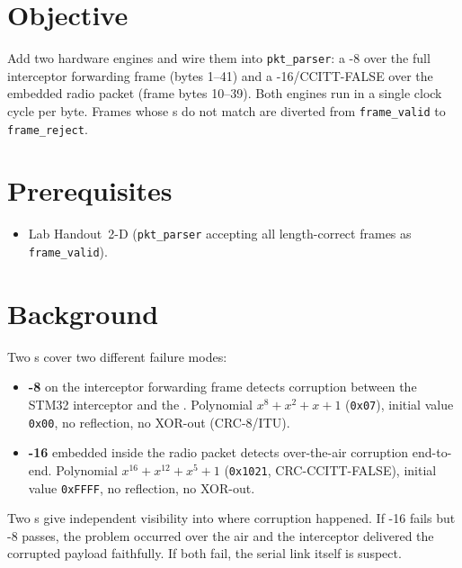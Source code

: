 \documentclass[11pt,letterpaper]{article}
\begin{document}

\section{Objective}
Add two hardware \CRC{} engines and wire them into \texttt{pkt\_parser}: a \CRC{}-8 over the full interceptor forwarding frame (bytes 1--41) and a \CRC{}-16/CCITT-FALSE over the embedded radio packet (frame bytes 10--39). Both engines run in a single clock cycle per byte. Frames whose \CRC{}s do not match are diverted from \texttt{frame\_valid} to \texttt{frame\_reject}.

\section{Prerequisites}
\begin{itemize}[leftmargin=2em]
	\item Lab Handout~2-D (\texttt{pkt\_parser} accepting all length-correct frames as \texttt{frame\_valid}).
\end{itemize}

\section{Background}
Two \CRC{}s cover two different failure modes:
\begin{itemize}[leftmargin=2em]
	\item \textbf{\CRC{}-8} on the interceptor forwarding frame detects corruption between the STM32 interceptor and the \FPGA{} \UART{}. Polynomial $x^8 + x^2 + x + 1$ (\texttt{0x07}), initial value \texttt{0x00}, no reflection, no XOR-out (CRC-8/ITU).
	\item \textbf{\CRC{}-16} embedded inside the radio packet detects over-the-air corruption end-to-end. Polynomial $x^{16} + x^{12} + x^5 + 1$ (\texttt{0x1021}, CRC-CCITT-FALSE), initial value \texttt{0xFFFF}, no reflection, no XOR-out.
\end{itemize}

\begin{tcolorbox}[infobox={Why not one \CRC{}?}]
	Two \CRC{}s give independent visibility into where corruption happened. If \CRC{}-16 fails but \CRC{}-8 passes, the problem occurred over the air and the interceptor delivered the corrupted payload faithfully. If both fail, the serial link itself is suspect.
\end{tcolorbox}
\end{document}

